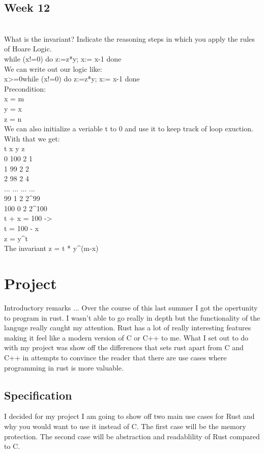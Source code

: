 \documentclass{article}
\theoremstyle{theorem}
\theoremstyle{definition}
\theoremstyle{remark}
\begin{document}
\subsection{Week 12}
\\What is the invariant? Indicate the reasoning steps in which you apply the rules of Hoare Logic.
\\while (x!=0) do z:=z*y;  x:= x-1 done
\\We can write out our logic like:
\\{x>=0}while (x!=0) do z:=z*y;  x:= x-1 done
\\Precondition:
\\x = m
\\y = x
\\z = n
\\We can also initialize a veriable t to 0 and use it to keep track of loop exuction.
\\With that we get:
\\t     x     y     z
\\0     100   2     1
\\1     99    2     2
\\2     98    2     4
\\...   ...   ...   ...
\\99    1     2     2^99
\\100   0     2     2^100
\\t + x = 100 ->
\\t = 100 - x
\\z = y^t
\\The invariant z = t * y^(m-x)


\section{Project}
Introductory remarks ...
Over the course of this last summer I got the opertunity to program in rust. I wasn't able to go really in depth but the functionality of the languge really caught my attention.
Rust has a lot of really interesting features making it feel like a modern version of C or C++ to me. What I set out to do with my project was 
show off the differences that sets rust apart from C and C++ in attempts to convince the reader that there are use cases where programming in rust is more valuable.

\subsection{Specification}
I decided for my project I am going to show off two main use cases for Rust and why you would want to use it instead of C. The first case will be 
the memory protection. The second case will be abstraction and readablility of Rust compared to C.
\end{document}
